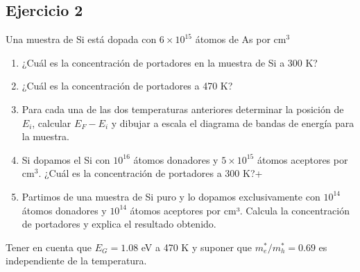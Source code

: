 \begin{Enunciado}
\subsection*{Ejercicio 2}

	Una muestra de Si está dopada con \( 6 \times 10^{15} \) átomos de As por cm$^3$
	\begin{enumerate}[label=\alph*)]
		\item ¿Cuál es la concentración de portadores en la muestra de Si a 300 K?
		\item ¿Cuál es la concentración de portadores a 470 K?
		\item Para cada una de las dos temperaturas anteriores determinar la posición de \( E_i \), calcular \( E_F - E_i \) y dibujar a escala el diagrama de bandas de energía para la muestra.
		\item Si dopamos el Si con \( 10^{16} \) átomos donadores y \( 5 \times 10^{15} \) átomos aceptores por cm$^3$. ¿Cuál es la concentración de portadores a 300 K?+
		\item Partimos de una muestra de Si puro y lo dopamos exclusivamente con \( 10^{14} \) átomos donadores y \( 10^{14} \) átomos aceptores por cm³. Calcula la concentración de portadores y explica el resultado obtenido.
	\end{enumerate}
	Tener en cuenta que \( E_G = 1.08 \) eV a 470 K y suponer que \( m_e^*/m_h^* = 0.69 \) es independiente de la temperatura.

\end{Enunciado}

